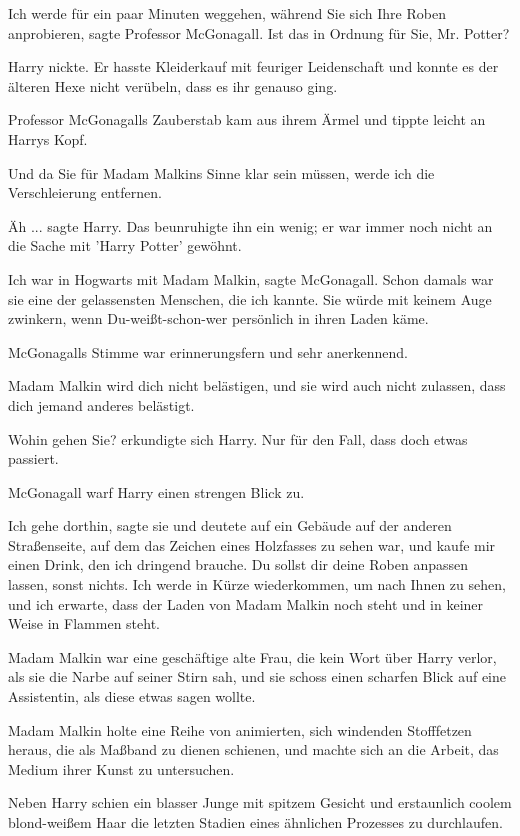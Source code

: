 \glqq{}Ich werde für ein paar Minuten weggehen, während Sie sich Ihre Roben
anprobieren\grqq{}, sagte Professor McGonagall. \glqq{}Ist das in Ordnung für
Sie, Mr. Potter?\grqq{}

Harry nickte. Er hasste Kleiderkauf mit feuriger Leidenschaft und konnte es der
älteren Hexe nicht verübeln, dass es ihr genauso ging.

Professor McGonagalls Zauberstab kam aus ihrem Ärmel und tippte leicht an Harrys
Kopf.

\glqq{}Und da Sie für Madam Malkins Sinne klar sein müssen, werde ich die
Verschleierung entfernen.\grqq{}

\glqq{}Äh ...\grqq{} sagte Harry. Das beunruhigte ihn ein wenig; er war immer
noch nicht an die Sache mit 'Harry Potter' gewöhnt.

\glqq{}Ich war in Hogwarts mit Madam Malkin\grqq{}, sagte McGonagall. \glqq{}Schon
damals war sie eine der gelassensten Menschen, die ich kannte. Sie würde mit
keinem Auge zwinkern, wenn Du-weißt-schon-wer persönlich in ihren Laden
käme.\grqq{}

McGonagalls Stimme war erinnerungsfern und sehr anerkennend.

\glqq{}Madam Malkin wird dich nicht belästigen, und sie wird auch nicht zulassen,
dass dich jemand anderes belästigt.\grqq{}

\glqq{}Wohin gehen Sie?\grqq{} erkundigte sich Harry. \glqq{}Nur für den Fall,
dass doch etwas passiert.\grqq{}

McGonagall warf Harry einen strengen Blick zu.

\glqq{}Ich gehe dorthin\grqq{}, sagte sie und deutete auf ein Gebäude auf der
anderen Straßenseite, auf dem das Zeichen eines Holzfasses zu sehen war, \glqq
und kaufe mir einen Drink, den ich dringend brauche. Du sollst dir deine Roben
anpassen lassen, sonst nichts. Ich werde in Kürze wiederkommen, um nach Ihnen zu
sehen, und ich erwarte, dass der Laden von Madam Malkin noch steht und in keiner
Weise in Flammen steht.\grqq{}

Madam Malkin war eine geschäftige alte Frau, die kein Wort über Harry verlor,
als sie die Narbe auf seiner Stirn sah, und sie schoss einen scharfen Blick auf
eine Assistentin, als diese etwas sagen wollte.

Madam Malkin holte eine Reihe von animierten, sich windenden Stofffetzen heraus,
die als Maßband zu dienen schienen, und machte sich an die Arbeit, das Medium
ihrer Kunst zu untersuchen.

Neben Harry schien ein blasser Junge mit spitzem Gesicht und erstaunlich coolem
blond-weißem Haar die letzten Stadien eines ähnlichen Prozesses zu durchlaufen.

